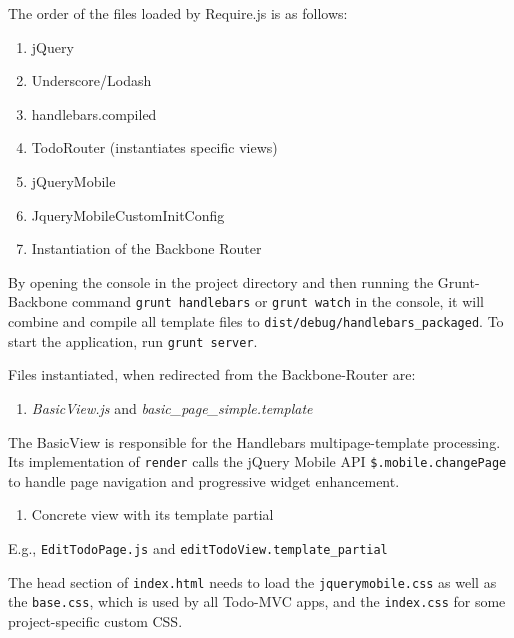 \documentclass[9pt]{book}
\begin{document}
The order of the files loaded by Require.js is as follows:

\begin{enumerate}
\def\labelenumi{\arabic{enumi}.}
\itemsep1pt\parskip0pt
\item
  jQuery
\item
  Underscore/Lodash
\item
  handlebars.compiled
\item
  TodoRouter (instantiates specific views)
\item
  jQueryMobile
\item
  JqueryMobileCustomInitConfig
\item
  Instantiation of the Backbone Router
\end{enumerate}

By opening the console in the project directory and then running the
Grunt-Backbone command \texttt{grunt handlebars} or \texttt{grunt watch}
in the console, it will combine and compile all template files to
\texttt{dist/debug/handlebars\_packaged}. To start the application, run
\texttt{grunt server}.

Files instantiated, when redirected from the Backbone-Router are:

\begin{enumerate}
\def\labelenumi{\alph{enumi})}
\itemsep1pt\parskip0pt
\item
  \emph{BasicView.js} and \emph{basic\_page\_simple.template}
\end{enumerate}

The BasicView is responsible for the Handlebars multipage-template
processing. Its implementation of \texttt{render} calls the jQuery
Mobile API \texttt{\$.mobile.changePage} to handle page navigation and
progressive widget enhancement.

\begin{enumerate}
\def\labelenumi{\alph{enumi})}
\setcounter{enumi}{1}
\itemsep1pt\parskip0pt
\item
  Concrete view with its template partial
\end{enumerate}

E.g., \texttt{EditTodoPage.js} and
\texttt{editTodoView.template\_partial}

The head section of \texttt{index.html} needs to load the
\texttt{jquerymobile.css} as well as the \texttt{base.css}, which is
used by all Todo-MVC apps, and the \texttt{index.css} for some
project-specific custom CSS.
\end{document}
